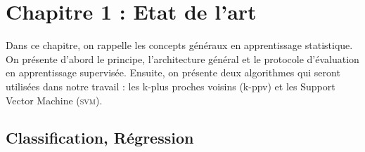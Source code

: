 \chapter*{Chapitre 1 : Etat de l'art}

Dans ce chapitre, on rappelle les concepts généraux en apprentissage statistique. On présente d'abord le principe, l'architecture général et le protocole d'évaluation en apprentissage supervisée. Ensuite, on présente deux algorithmes qui seront utilisées dans notre travail : les k-plus proches voisins (k-ppv) et les Support Vector Machine (\textsc{svm}).

\section*{Classification, Régression}
